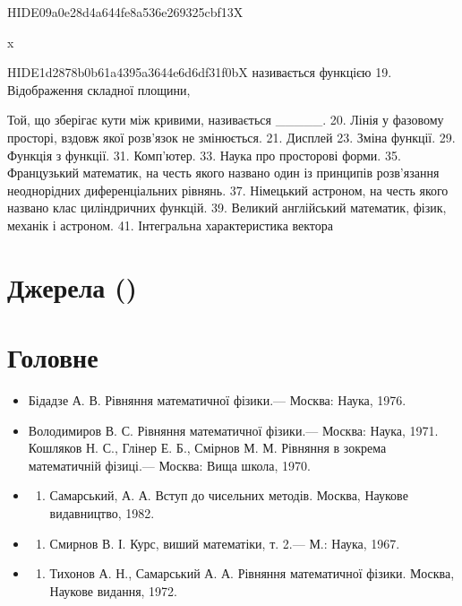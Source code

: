 \documentclass[
  ukrainian,
]{article}
\providecommand{\tightlist}{%
  \setlength{\itemsep}{0pt}\setlength{\parskip}{0pt}}
\begin{document}
HIDE09a0e28d4a644fe8a536e269325cbf13X

x

HIDE1d2878b0b61a4395a3644e6d6df31f0bX називається функцією 19.
Відображення складної площини,

Той, що зберігає кути між кривими, називається \_\_\_\_\_. 20. Лінія у
фазовому просторі, вздовж якої розв'язок не змінюється. 21. Дисплей 23.
Зміна функції. 29. Функція з функції. 31. Комп'ютер. 33. Наука про
просторові форми. 35. Французький математик, на честь якого названо один
із принципів розв'язання неоднорідних диференціальних рівнянь. 37.
Німецький астроном, на честь якого названо клас циліндричних функцій.
39. Великий англійський математик, фізик, механік і астроном. 41.
Інтегральна характеристика вектора

\section{Джерела ()}\label{ux434ux436ux435ux440ux435ux43bux430}

\section{Головне}\label{ux433ux43eux43bux43eux432ux43dux435}

\begin{itemize}
\tightlist
\item
  Бідадзе А. В. Рівняння математичної фізики.--- Москва: Наука, 1976.
\item
  Володимиров В. С. Рівняння математичної фізики.--- Москва: Наука,
  1971. Кошляков Н. С., Глінер Е. Б., Смірнов М. М. Рівняння в зокрема
  математичній фізиці.--- Москва: Вища школа, 1970.
\item
  \begin{enumerate}
  \def\labelenumi{\arabic{enumi}.}
  \setcounter{enumi}{3}
  \tightlist
  \item
    Самарський, А. А. Вступ до чисельних методів. Москва, Наукове
    видавництво, 1982.
  \end{enumerate}
\item
  \begin{enumerate}
  \def\labelenumi{\arabic{enumi}.}
  \setcounter{enumi}{4}
  \tightlist
  \item
    Смирнов В. І. Курс, виший математіки, т. 2.--- М.: Наука, 1967.
  \end{enumerate}
\item
  \begin{enumerate}
  \def\labelenumi{\arabic{enumi}.}
  \setcounter{enumi}{5}
  \tightlist
  \item
    Тихонов А. Н., Самарський А. А. Рівняння математичної фізики.
    Москва, Наукове видання, 1972.
  \end{enumerate}
\end{itemize}
\end{document}
